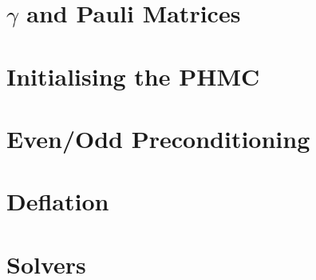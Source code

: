 \documentclass[a4paper,12pt]{article}
\begin{document}
\begin{appendix}
  \section{$\gamma$  and Pauli  Matrices}

  \section{Initialising the PHMC}
  \section{Even/Odd Preconditioning}

  \section{Deflation}
  
  \section{Solvers}
\end{appendix}
\end{document}

